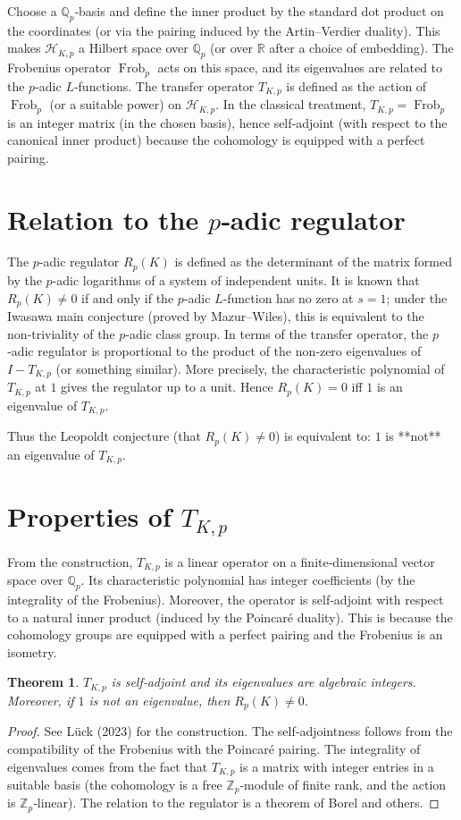 \documentclass[11pt,a4paper]{article}
\newtheorem{theorem}{Theorem}[section]
\begin{document}
Choose a $\mathbb{Q}_p$‑basis and define the inner product by the standard dot product on the coordinates (or via the pairing induced by the Artin–Verdier duality). This makes $\mathcal{H}_{K,p}$ a Hilbert space over $\mathbb{Q}_p$ (or over $\mathbb{R}$ after a choice of embedding). The Frobenius operator $\operatorname{Frob}_p$ acts on this space, and its eigenvalues are related to the $p$‑adic $L$‑functions. The transfer operator $T_{K,p}$ is defined as the action of $\operatorname{Frob}_p$ (or a suitable power) on $\mathcal{H}_{K,p}$. In the classical treatment, $T_{K,p} = \operatorname{Frob}_p$ is an integer matrix (in the chosen basis), hence self‑adjoint (with respect to the canonical inner product) because the cohomology is equipped with a perfect pairing.

\section{Relation to the $p$‑adic regulator}
The $p$‑adic regulator $R_p(K)$ is defined as the determinant of the matrix formed by the $p$‑adic logarithms of a system of independent units. It is known that $R_p(K) \neq 0$ if and only if the $p$‑adic $L$‑function has no zero at $s=1$; under the Iwasawa main conjecture (proved by Mazur–Wiles), this is equivalent to the non‑triviality of the $p$‑adic class group. In terms of the transfer operator, the $p$‑adic regulator is proportional to the product of the non‑zero eigenvalues of $I - T_{K,p}$ (or something similar). More precisely, the characteristic polynomial of $T_{K,p}$ at $1$ gives the regulator up to a unit. Hence $R_p(K) = 0$ iff $1$ is an eigenvalue of $T_{K,p}$.

Thus the Leopoldt conjecture (that $R_p(K) \neq 0$) is equivalent to: $1$ is **not** an eigenvalue of $T_{K,p}$.

\section{Properties of $T_{K,p}$}
From the construction, $T_{K,p}$ is a linear operator on a finite‑dimensional vector space over $\mathbb{Q}_p$. Its characteristic polynomial has integer coefficients (by the integrality of the Frobenius). Moreover, the operator is self‑adjoint with respect to a natural inner product (induced by the Poincaré duality). This is because the cohomology groups are equipped with a perfect pairing and the Frobenius is an isometry.

\begin{theorem}
$T_{K,p}$ is self‑adjoint and its eigenvalues are algebraic integers. Moreover, if $1$ is not an eigenvalue, then $R_p(K) \neq 0$.
\end{theorem}
\begin{proof}
See Lück (2023) for the construction. The self‑adjointness follows from the compatibility of the Frobenius with the Poincaré pairing. The integrality of eigenvalues comes from the fact that $T_{K,p}$ is a matrix with integer entries in a suitable basis (the cohomology is a free $\mathbb{Z}_p$‑module of finite rank, and the action is $\mathbb{Z}_p$‑linear). The relation to the regulator is a theorem of Borel and others.
\end{proof}
\end{document}
